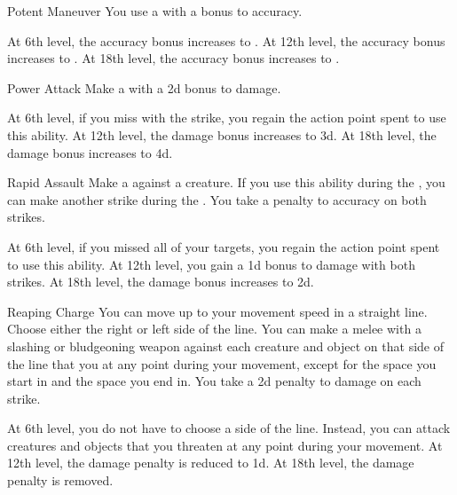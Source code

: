 {            \begin{ability}{Potent Maneuver}
                You use a  with a  bonus to accuracy.

                At 6th level, the accuracy bonus increases to .
                At 12th level, the accuracy bonus increases to .
                At 18th level, the accuracy bonus increases to .
            \end{ability}

            \begin{ability}{Power Attack}
                Make a  with a \plus2d bonus to damage.

                At 6th level, if you miss with the strike, you regain the action point spent to use this ability.
                At 12th level, the damage bonus increases to \plus3d.
                At 18th level, the damage bonus increases to \plus4d.
            \end{ability}

            \begin{ability}{Rapid Assault}
                Make a  against a creature.
                If you use this ability during the , you can make another strike during the .
                You take a  penalty to accuracy on both strikes.

                At 6th level, if you missed all of your targets, you regain the action point spent to use this ability.
                At 12th level, you gain a \plus1d bonus to damage with both strikes.
                At 18th level, the damage bonus increases to \plus2d.
            \end{ability}

            \begin{ability}{Reaping Charge}
                You can move up to your movement speed in a straight line.
                Choose either the right or left side of the line.
                You can make a melee  with a slashing or bludgeoning weapon against each creature and object on that side of the line that you  at any point during your movement, except for the space you start in and the space you end in.
                You take a \minus2d penalty to damage on each strike.

                At 6th level, you do not have to choose a side of the line.
                Instead, you can attack creatures and objects that you threaten at any point during your movement.
                At 12th level, the damage penalty is reduced to \minus1d.
                At 18th level, the damage penalty is removed.
            \end{ability}

}
